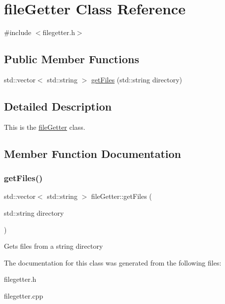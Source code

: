 \hypertarget{classfileGetter}{}\section{file\+Getter Class Reference}
\label{classfileGetter}


{\ttfamily \#include $<$filegetter.\+h$>$}

\subsection*{Public Member Functions}
\begin{DoxyCompactItemize}
\item 
std\+::vector$<$ std\+::string $>$ \hyperlink{classfileGetter_a2ab6fdcd4ae9377b24f51c35497dfd49}{get\+Files} (std\+::string directory)
\end{DoxyCompactItemize}


\subsection{Detailed Description}
This is the \hyperlink{classfileGetter}{file\+Getter} class. 

\subsection{Member Function Documentation}
\mbox{\label{classfileGetter_a2ab6fdcd4ae9377b24f51c35497dfd49}} 
\subsubsection{\texorpdfstring{get\+Files()}{getFiles()}}
{\footnotesize\ttfamily std\+::vector$<$ std\+::string $>$ file\+Getter\+::get\+Files (\begin{DoxyParamCaption}\item[{std\+::string}]{directory }\end{DoxyParamCaption})}

Gets files from a string directory 

The documentation for this class was generated from the following files\+:\begin{DoxyCompactItemize}
\item 
filegetter.\+h\item 
filegetter.\+cpp\end{DoxyCompactItemize}
